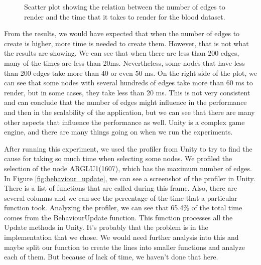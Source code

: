 \begin{figure}[h!]
  \centering
  \begin{minipage}{.8\textwidth}
  \end{minipage}
\caption{Scatter plot showing the relation between the number of edges to render and the time that it takes to render for the blood dataset.}
\label{fig:scalability_edges_blood}
\end{figure}

From the results, we would have expected that when the number of edges to create is higher, more time is needed to create them. However, that is not what the results are showing. We can see that when there are less than 200 edges, many of the times are less than 20ms. Nevertheless, some nodes that have less than 200 edges take more than 40 or even 50 ms. On the right side of the plot, we can see that some nodes with several hundreds of edges take more than 60 ms to render, but in some cases, they take less than 20 ms. This is not very consistent and can conclude that the number of edges might influence in the performance and then in the scalability of the application, but we can see that there are many other aspects that influence the performance as well. Unity is a complex game engine, and there are many things going on when we run the experiments.

After running this experiment, we used the profiler from Unity to try to find the cause for taking so much time when selecting some nodes. We profiled the selection of the node ARGLU1(1607), which has the maximum number of edges. In Figure \ref{fig:behaviour_update}, we can see a screenshot of the profiler in Unity. There is a list of functions that are called during this frame. Also, there are several columns and we can see the percentage of the time that a particular function took. Analyzing the profiler, we can see that 65.4\% of the total time comes from the BehaviourUpdate function. This function processes all the Update methods in Unity. It's probably that the problem is in the implementation that we chose. We would need further analysis into this and maybe split our function to create the lines into smaller functions and analyze each of them. But because of lack of time, we haven't done that here.

